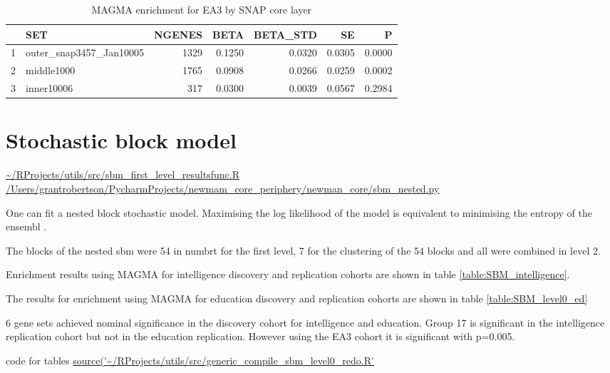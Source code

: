 \begin{table}[ht]
\centering
\begin{tabular}{rlrrrrr}
  \hline
 & SET & NGENES & BETA & BETA\_STD & SE & P \\ 
  \hline
1 & outer\_snap3457\_Jan10005 &  1329 & 0.1250 & 0.0320 & 0.0305 & 0.0000 \\ 
  2 & middle1000 &  1765 & 0.0908 & 0.0266 & 0.0259 & 0.0002 \\ 
  3 & inner10006 &   317 & 0.0300 & 0.0039 & 0.0567 & 0.2984 \\ 
   \hline
\end{tabular}
\caption{MAGMA enrichment for EA3 by SNAP core layer} 
\label{Table:MAGMA enrichment for EA3 by SNAP core layer}
\end{table}


\section{Stochastic block model}

\url{~/RProjects/utils/src/sbm_first_level_resultsfunc.R}
\url{/Users/grantrobertson/PycharmProjects/newmam_core_periphery/newman_core/sbm_nested.py}

One can fit a nested block stochastic model. Maximising the log likelihood of the model is equivalent to minimising the entropy of the ensembl \cite{peixoto2014hierarchical}.

The blocks of the nested sbm were 54 in numbrt for the first level, 7 for the clustering of the 54 blocks and all were combined in level 2. 

Enrichment results using MAGMA for intelligence discovery and replication cohorts are shown in table \ref{table:SBM_intelligence}. 

The results for enrichment using MAGMA for education discovery and replication cohorts are shown in table \ref{table:SBM_level0_ed}

6 gene sets achieved nominal significance in the discovery cohort for intelligence and education. Group 17 is significant in the intelligence replication cohort but not in the education replication. However using the EA3 cohort it is significant with p=0.005.

code for tables \url{source('~/RProjects/utils/src/generic_compile_sbm_level0_redo.R'}


